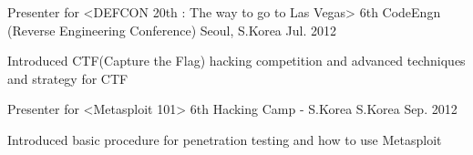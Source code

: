
\begin{cventries}

  \cventry
  {Presenter for <DEFCON 20th : The way to go to Las Vegas>} %
  {6th CodeEngn (Reverse Engineering Conference)} %
  {Seoul, S.Korea} %
  {Jul. 2012} %
  {
    \begin{cvitems} %
    \item {Introduced CTF(Capture the Flag) hacking competition and advanced techniques and strategy for CTF}
    \end{cvitems}
  }

  \cventry
  {Presenter for <Metasploit 101>} %
  {6th Hacking Camp - S.Korea} %
  {S.Korea} %
  {Sep. 2012} %
  {
    \begin{cvitems} %
    \item {Introduced basic procedure for penetration testing and how to use Metasploit}
    \end{cvitems}
  }

\end{cventries}
